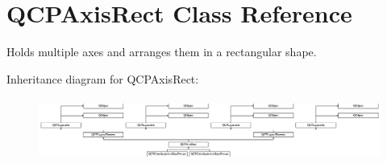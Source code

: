 \hypertarget{class_q_c_p_axis_rect}{}\section{Q\+C\+P\+Axis\+Rect Class Reference}
\label{class_q_c_p_axis_rect}


Holds multiple axes and arranges them in a rectangular shape.  


Inheritance diagram for Q\+C\+P\+Axis\+Rect\+:\begin{figure}[H]
\begin{center}
\leavevmode
\includegraphics[height=2.110553cm]{class_q_c_p_axis_rect}
\end{center}
\end{figure}
